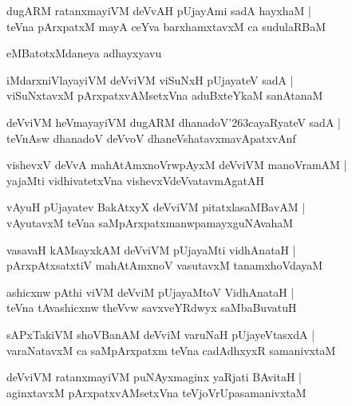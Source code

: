 \documentclass[twoside,12pt,openright]{book}
\def\S{\char'263}
\newcounter{shloka}[chapter]
\begin{document}
\begin{shloka}%
dugARM ratanxmayiVM deVvAH pUjayAmi sadA hayxhaM |\\
teVna pArxpatxM mayA ceYva barxhamxtavxM ca sudulaRBaM 
\end{shloka}

\begin{center}
eMBatotxMdaneya adhayxyavu
\end{center}

\begin{shloka}%
iMdarxniVlayayiVM deVviVM viSuNxH pUjayateV sadA |\\
viSuNxtavxM pArxpatxvAMsetxVna aduBxteYkaM sanAtanaM 
\end{shloka}

\begin{shloka}%
deVviVM heVmayayiVM dugARM dhanadoV\S cayaRyateV sadA |\\
teVnAsw dhanadoV deVvoV dhaneVshatavxmavApatxvAnf
\end{shloka}

\begin{shloka}%
vishevxV deVvA mahAtAmxnoVrwpAyxM deVviVM manoVramAM |\\
yajaMti vidhivatetxVna vishevxVdeVvatavmAgatAH
\end{shloka}

\begin{shloka}%
vAyuH pUjayatev BakAtxyX deVviVM pitatxlasaMBavAM |\\
vAyutavxM teVna saMpArxpatxmanwpamayxguNAvahaM 
\end{shloka}

\begin{shloka}%
vasavaH kAMsayxkAM deVviVM pUjayaMti vidhAnataH |\\
pArxpAtxsatxtiV mahAtAmxnoV vasutavxM tanamxhoVdayaM 
\end{shloka}

\begin{shloka}%
ashicxnw pAthi viVM deVviM pUjayaMtoV VidhAnataH |\\
teVna tAvashicxnw theVvw savxveYRdwyx saMbaBuvatuH 
\end{shloka}

\begin{shloka}%
sAPxTakiVM shoVBanAM deVviM varuNaH pUjayeVtasxdA |\\
varaNatavxM ca saMpArxpatxm teVna cadAdhxyxR samanivxtaM 
\end{shloka}

\begin{shloka}%
deVviVM ratanxmayiVM puNAyxmaginx yaRjati BAvitaH |\\
aginxtavxM pArxpatxvAMsetxVna teVjoVrUpasamanivxtaM 
\end{shloka}
\end{document}
